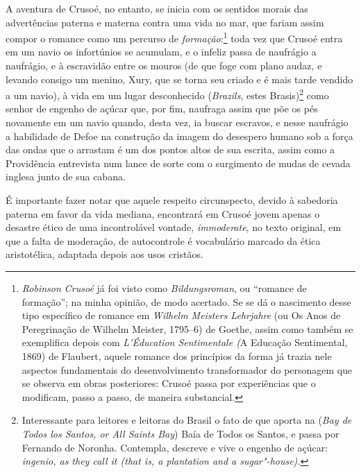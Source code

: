 A aventura de Crusoé, no entanto, se inicia com os sentidos morais das
advertências paterna e materna contra uma vida no mar, que fariam assim
compor o romance como um percurso de \emph{formação}:\footnote{\emph{Robinson
  Crusoé} já foi visto como \emph{Bildungsroman}, ou ``romance de
  formação''; na minha opinião, de modo acertado. Se se dá o nascimento
  desse tipo específico de romance em \emph{Wilhelm Meisters Lehrjahre}
  (ou Os Anos de Peregrinação de Wilhelm Meister, 1795--6) de Goethe,
  assim como também se exemplifica depois com \emph{L'Éducation
  Sentimentale (}A Educação Sentimental, 1869) de Flaubert, aquele
  romance dos princípios da forma já trazia nele aspectos fundamentais
  do desenvolvimento transformador do personagem que se observa em obras
  posteriores: Crusoé passa por experiências que o modificam, passo a
  passo, de maneira substancial.} toda vez que Crusoé entra em um navio
os infortúnios se acumulam, e o infeliz passa de naufrágio a naufrágio,
e à escravidão entre os mouros (de que foge com plano audaz, e levando
consigo um menino, Xury, que se torna seu criado e é mais tarde vendido
a um navio), à vida em um lugar desconhecido (\emph{Brazils}, estes
Brasis)\footnote{Interessante para leitores e leitoras do Brasil o fato
  de que aporta na (\emph{Bay de Todos los Santos, or All Saints Bay})
  Baía de Todos os Santos, e passa por Fernando de Noronha. Contempla,
  descreve e vive o engenho de açúcar: \emph{ingenio, as they call it
  (that is, a plantation and a sugar"-house).}} como senhor de engenho de
açúcar que, por fim, naufraga assim que põe os pés novamente em um navio
quando, desta vez, ia buscar escravos, e nesse naufrágio a habilidade de
Defoe na construção da imagem do desespero humano sob a força das ondas
que o arrastam é um dos pontos altos de sua escrita, assim como a
Providência entrevista num lance de sorte com o surgimento de mudas de
cevada inglesa junto de sua cabana.

É importante
fazer notar que aquele respeito circunspecto, devido à sabedoria paterna
em favor da vida mediana, encontrará em Crusoé jovem apenas o desastre
ético de uma incontrolável vontade, \emph{immoderate}, no texto
original, em que a falta de moderação, de autocontrole é vocabulário
marcado da ética aristotélica, adaptada depois aos usos cristãos.

